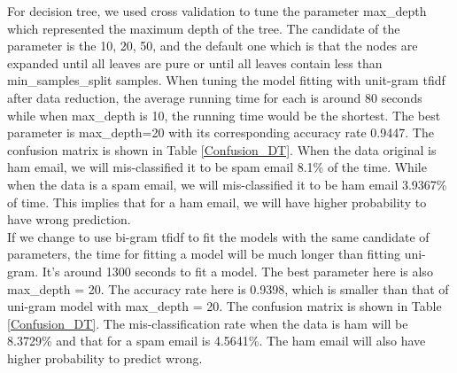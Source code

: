 
For decision tree, we used cross validation to tune the parameter max\_depth which represented the maximum depth of the tree. The candidate of the parameter is the 10, 20, 50, and the default one which is that the nodes are expanded until all leaves are pure or until all leaves contain less than min\_samples\_split samples. When tuning the model fitting with unit-gram tfidf after data reduction, the average running time for each is around 80 seconds while when max\_depth is 10, the running time would be the shortest. The best parameter is max\_depth=20 with its corresponding accuracy rate 0.9447. The confusion matrix is shown in Table \ref{Confusion_DT}. When the data original is ham email, we will mis-classified it to be spam email 8.1\% of the time. While when the data is a spam email, we will mis-classified it to be ham email 3.9367\% of time. This implies that for a ham email, we will have higher probability to have wrong prediction.\\

If we change to use bi-gram tfidf to fit the models with the same candidate of parameters, the time for fitting a model will be much longer than fitting uni-gram. It's around 1300 seconds to fit a model. The best parameter here is also max\_depth = 20. The accuracy rate here is 0.9398, which is smaller than that of uni-gram model with max\_depth = 20. The confusion matrix is shown in Table \ref{Confusion_DT}. The mis-classification rate when the data is ham will be 8.3729\% and that for a spam email is 4.5641\%. The ham email will also have higher probability to predict wrong. 



